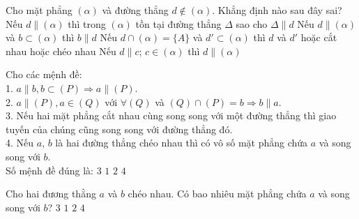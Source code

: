 \begin{ex}%
Cho mặt phẳng $(\alpha)$ và đường thẳng $d \notin(\alpha)$. Khẳng định nào sau đây sai?
\choice
{Nếu $d \parallel (\alpha)$ thì trong $(\alpha)$ tồn tại đường thẳng $\Delta$ sao cho $\Delta \parallel  d$}
{\True Nếu $d \parallel (\alpha)$ và $b \subset(\alpha)$ thì $b \parallel  d$}
{Nếu $d \cap(\alpha)=\{A\}$ và $d' \subset(\alpha)$ thì $d$ và $d'$ hoặc cắt nhau hoặc chéo nhau}
{Nếu $d \parallel  c $; $ c \in(\alpha)$ thì $d \parallel (\alpha)$}
\end{ex}

\begin{ex}%
Cho các mệnh đề:\\
1. $a \parallel  b, b \subset(P) \Rightarrow a \parallel (P)$.\\
2. $a \parallel (P), a \in(Q)$ với $\forall(Q)$ và $(Q) \cap(P)=b \Rightarrow b \parallel  a$.\\
3. Nếu hai mặt phẳng cắt nhau cùng song song với một đường thẳng thì giao tuyến của chúng cũng song song với đường thẳng đó.\\
4. Nếu $a$, $b$ là hai đường thẳng chéo nhau thì có vô số mặt phẳng chứa $a$ và song song với $b$. \\
Số mệnh đề đúng là:
\choice
{\True $3$}
{$1$}
{$2$}
{$4$}
\end{ex}

\begin{ex}%
Cho hai đương thằng $a$ và $b$ chéo nhau. Có bao nhiêu mặt phẳng chứa $a$ và song song với $b$?
\choice
{$3$}
{\True $1$}
{$2$}
{$4$}
\end{ex}


